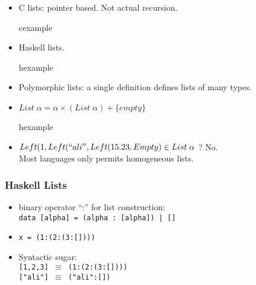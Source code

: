 \begin{frame}
 \begin{itemize}[<+->]
  \item C lists: pointer based. Not actual recursion.
  \begin{beamercolorbox}{cexample}
   \codelisteC
  \end{beamercolorbox}
\item Haskell lists.
  \begin{beamercolorbox}{hexample}
   \codelisteH
  \end{beamercolorbox}
 \end{itemize}
\end{frame}
\begin{frame}
 \begin{itemize}[<+->]
  \item Polymorphic lists: a single definition defines lists of many types.
  \item	$List\;\alpha = \alpha \times (List\;\alpha) + \{empty\}$
\begin{beamercolorbox}{hexample}
\codecoklisteH
\end{beamercolorbox}
\item $Left(1,Left(``ali'',Left(15.23,Empty) \in List\;\alpha$ ? \pause
No.\\
	Most languages only permits homogeneous lists.
 \end{itemize}
\end{frame}

\begin{frame}
\frametitle{Haskell Lists}
\begin{itemize}[<+->]
 \item binary operator ``:'' for list construction:\\
	\texttt{data [alpha] = (alpha : [alpha]) | []}
 \item \texttt{x = (1:(2:(3:[])))}
 \item Syntactic sugar:\\
	\texttt{[1,2,3] $\equiv$ (1:(2:(3:[])))}\\
	\texttt{["ali"] $\equiv$ ("ali":[])}
\end{itemize}
\end{frame}

